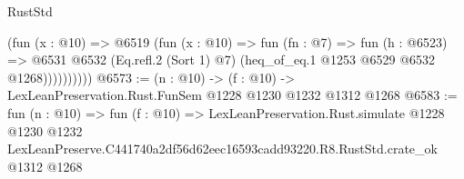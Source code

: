 \begin{lexlean}{RustStd}
\begin{coremodule}
                  (fun (x : @10) =>
                  @6519
                    (fun (x : @10) =>
                    fun (fn : @7) =>
                    fun (h : @6523) =>
                    @6531
                      @6532
                      (Eq.refl.{2} (Sort 1) @7)
                      (heq_of_eq.{1} @1253 @6529 @6532 @1268))))))))))
@6573 := (n : @10) -> (f : @10) -> LexLeanPreservation.Rust.FunSem @1228 @1230 @1232 @1312 @1268
@6583 := fun (n : @10) =>
  fun (f : @10) =>
  LexLeanPreservation.Rust.simulate
    @1228
    @1230
    @1232
    LexLeanPreserve.C441740a2df56d62eec16593cadd93220.R8.RustStd.crate_ok
    @1312
    @1268
\end{coremodule}
\end{lexlean}
